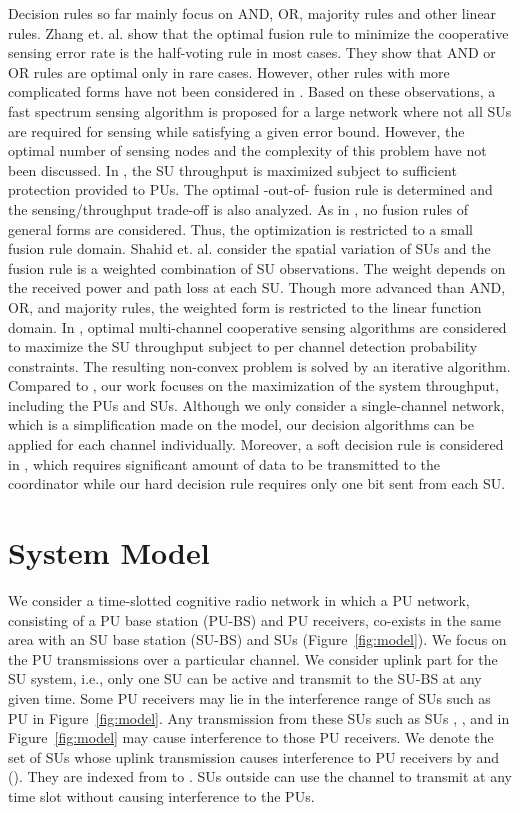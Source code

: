 \documentclass[conference]{IEEEtran}
\begin{document}
Decision rules so far mainly focus on AND, OR, majority rules and other linear rules. Zhang et. al. \cite{4533677} show that the optimal fusion rule to minimize the cooperative sensing error rate is the half-voting rule in most cases. They show that AND or OR 
rules are optimal only in rare cases. However, other rules with more 
complicated forms have not been considered in \cite{4533677}. Based on these observations, a fast spectrum sensing algorithm is proposed for a large network where not all SUs are required for sensing while satisfying a given error bound. However, the optimal number of sensing nodes and the complexity of this problem have not been discussed. In \cite{5169958}, the SU throughput is maximized subject to sufficient protection provided to PUs. The optimal -out-of- fusion rule is determined and the sensing/throughput trade-off is also analyzed. As in \cite{4533677}, no fusion rules of general forms are considered. Thus, the optimization is restricted to a small fusion rule domain. Shahid et. al. \cite{Shahid_Kamruzzaman_2010} consider the spatial variation of SUs and the fusion rule is a weighted combination of SU observations. The weight depends on the received power and path loss at each SU. Though more advanced than AND, OR, and majority rules, the weighted form is restricted to the linear function domain. In \cite{Fan_Jiang_2010}, optimal multi-channel cooperative sensing algorithms are considered to maximize the SU throughput subject to per channel detection probability constraints. The resulting non-convex problem is solved by an iterative algorithm. Compared to \cite{Fan_Jiang_2010}, our work focuses on the maximization of the system throughput, including the PUs and SUs. Although we only consider a single-channel network, which is a simplification made on the model, our decision algorithms can be applied for each channel individually. Moreover, a soft decision rule is considered in \cite{Fan_Jiang_2010}, which requires significant amount of data to be transmitted to the coordinator while our hard decision rule requires only one bit sent from each SU. 

\section{System Model}
\label{sec:model}
We consider a time-slotted cognitive radio network in which a PU network, consisting of a PU base station (PU-BS) and PU receivers, co-exists in the same area with an SU base station (SU-BS) and  SUs (Figure~\ref{fig:model}). We focus on the PU transmissions over a particular channel. We consider uplink part for the SU system, i.e., only one SU can be active and transmit to the SU-BS at any given time. Some PU receivers may lie in the interference range of SUs such as PU  in Figure~\ref{fig:model}. Any transmission from these SUs such as SUs , , and  in Figure~\ref{fig:model} may cause interference to those PU receivers. We denote the set of SUs whose uplink transmission causes interference to PU receivers by  and  (). They are indexed from  to . SUs outside  can use the channel to transmit at any time slot without causing interference to the PUs.     
\end{document}
